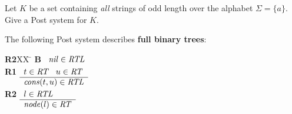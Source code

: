 \documentclass[addpoints]{exam}
\newcommand{\tf}[1][{}]{%
\fillin[#1][0.25in]%
}
\begin{document}
\begin{questions}
\begin{parts}
\end{parts}

\question[4] Let $K$ be a set containing \emph{all} strings of odd length over the 
alphabet $\Sigma = \{a\}$.  Give a Post system for $K$.
\vspace{50mm}


\question The following Post system describes \textbf{full binary trees}:

\begin{tabbing}
	{\bf R2}XX \=  \kill
	{\bf B} \>
	\(\begin{array}[t]{l}
	\mbox{\it nil\/}\in\mbox{\it RTL\/}
	\end{array}\) \\[2ex]
	{\bf R1} \>
	\(\begin{array}[t]{l}
	t\in\mbox{\it RT\/}\;\;\;u\in\mbox{\it RT\/} \\
	\hline
	\mbox{\it cons\/}(t,u)\in\mbox{\it RTL\/}
	\end{array}\) \\[2ex]
	{\bf R2} \>
	\(\begin{array}[t]{l}
	l\in\mbox{\it RTL\/} \\
	\hline
	\mbox{\it node\/}(l)\in\mbox{\it RT\/}
	\end{array}\)
\end{tabbing}

\end{questions}
\end{document}
